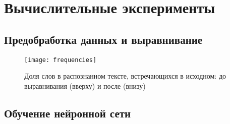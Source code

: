 \documentclass{main.tex}[subfiles]
\begin{document}
\section{Вычислительные эксперименты}
\subsection{Предобработка данных и выравнивание}

\begin{figure}[H]
    \centering

    \texttt{[image: frequencies]}
    \caption{Доля слов в распознанном тексте, встречающихся в исходном: до выравнивания (вверху) и после (внизу)}
    \label{fig:frequencies} %
\end{figure}

\subsection{Обучение нейронной сети}
\end{document}
